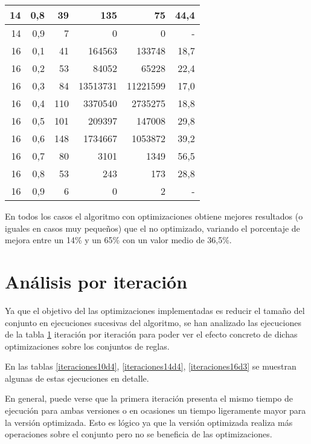 \begin{table}[htbp]
\begin{center}
\begin{tabular}{|r|r|r|r|r|r|}
				14 & 0,8 & 39 & 135 & 75 & 44,4 \\ \hline
				14 & 0,9 & 7 & 0 & 0 & - \\ \hline
				16 & 0,1 & 41 & 164563 & 133748 & 18,7 \\ \hline
				16 & 0,2 & 53 & 84052 & 65228 & 22,4 \\ \hline
				16 & 0,3 & 84 & 13513731 & 11221599 & 17,0 \\ \hline
				16 & 0,4 & 110 & 3370540 & 2735275 & 18,8 \\ \hline
				16 & 0,5 & 101 & 209397 & 147008 & 29,8 \\ \hline
				16 & 0,6 & 148 & 1734667 & 1053872 & 39,2 \\ \hline
				16 & 0,7 & 80 & 3101 & 1349 & 56,5 \\ \hline
				16 & 0,8 & 53 & 243 & 173 & 28,8 \\ \hline
				16 & 0,9 & 6 & 0 & 2 & - \\ \hline
			\end{tabular}
		\end{center}
		\label{tiempos_totales}
	\end{table}

	En todos los casos el algoritmo con optimizaciones obtiene mejores resultados (o iguales en casos muy pequeños) que el no optimizado, variando el porcentaje de mejora entre un 14\% y un 65\% con un valor medio de 36,5\%.
	
\section*{Análisis por iteración}

	Ya que el objetivo del las optimizaciones implementadas es reducir el tamaño del conjunto en ejecuciones sucesivas del algoritmo, se han analizado las ejecuciones de la tabla \ref{tiempos_totales} iteración por iteración para poder ver el efecto concreto de dichas optimizaciones sobre los conjuntos de reglas.
	
	En las tablas \ref{iteraciones10d4}, \ref{iteraciones14d4}, \ref{iteraciones16d3}  se muestran algunas de estas ejecuciones en detalle.
	
	En general, puede verse que la primera iteración presenta el mismo tiempo de ejecución para ambas versiones o en ocasiones un tiempo ligeramente mayor para la versión optimizada. Esto es lógico ya que la versión optimizada realiza más operaciones sobre el conjunto pero no se beneficia de las optimizaciones.
	
